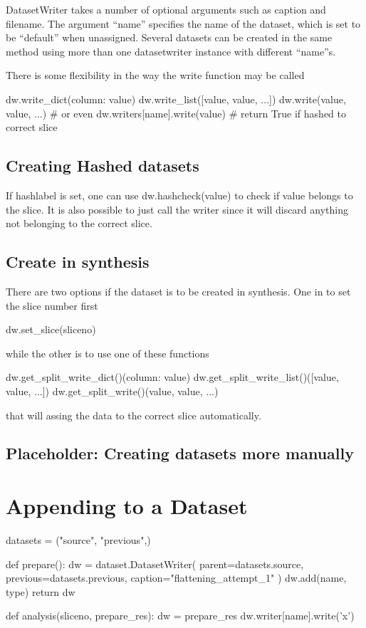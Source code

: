 DatasetWriter takes a number of optional arguments such as caption and
filename.  The argument ``name'' specifies the name of the dataset,
which is set to be ``default'' when unassigned.  Several datasets can
be created in the same method using more than one datasetwriter
instance with different ``name''s.

There is some flexibility in the way the write function may be called

\begin{python}
  dw.write_dict({column: value})
  dw.write_list([value, value, ...])
  dw.write(value, value, ...)
  # or even
  dw.writers[name].write(value)  # return True if hashed to correct slice
\end{python}


\subsection{Creating Hashed datasets}
If hashlabel is set, one can use dw.hashcheck(value) to check if value
belongs to the slice.  It is also possible to just call the writer
since it will discard anything not belonging to the correct slice.



\subsection{Create in synthesis}

There are two options if the dataset is to be created in synthesis.
One in to set the slice number first

\begin{python}
  dw.set_slice(sliceno)
\end{python}
while the other is to use one of these functions

\begin{python}
  dw.get_split_write_dict()({column: value})
  dw.get_split_write_list()([value, value, ...])
  dw.get_split_write()(value, value, ...)
\end{python}
that will assing the data to the correct slice automatically.

\subsection{Placeholder:  Creating datasets more manually}


\section{Appending to a Dataset}
\begin{python}
datasets = ("source", "previous",)

def prepare():
  dw = dataset.DatasetWriter(
    parent=datasets.source,
    previous=datasets.previous,
    caption="flattening_attempt_1"
  )
  dw.add(name, type)
  return dw

def analysis(sliceno, prepare_res):
  dw = prepare_res
  dw.writer[name].write('x')
\end{python}



  
